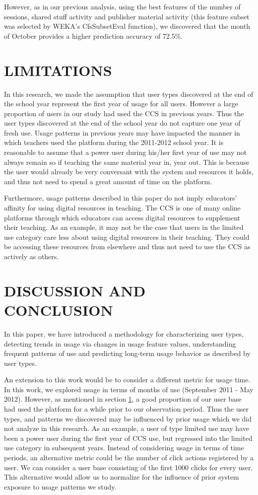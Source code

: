 \documentclass{acm_proc_article-sp}
\begin{document}
However, as in our previous analysis, using the best features of the number of sessions, shared stuff activity and publisher material activity (this feature subset was selected by WEKA's CfsSubsetEval function), we discovered that the month of October provides a higher prediction accuracy of 72.5\%.

\section{LIMITATIONS}\label{limitations}
In this research, we made the assumption that user types discovered at the end of the school year represent the first year of usage for all users. However a large proportion of users in our study had used the CCS in previous years. Thus the user types discovered at the end of the school year do not capture one year of fresh use. Usage patterns in previous years may have impacted the manner in which teachers used the platform during the 2011-2012 school year. It is reasonable to assume that a power user during his/her first year of use may not always remain so if teaching the same material year in, year out. This is because the user would already be very conversant with the system and resources it holds, and thus not need to spend a great amount of time on the platform.

Furthermore, usage patterns described in this paper do not imply educators' affinity for using digital resources in teaching. The CCS is one of many online platforms through which educators can access digital resources to supplement their teaching. As an example, it may not be the case that users in the limited use category care less about using digital resources in their teaching. They could be accessing these resources from elsewhere and thus not need to use the CCS as actively as others.

\section{DISCUSSION AND CONCLUSION}
In this paper, we have introduced a methodology for characterizing user types, detecting trends in usage via changes in usage feature values, understanding frequent patterns of use and predicting long-term usage behavior as described by user types.

An extension to this work would be to consider a different metric for usage time. In this work, we explored usage in terms of months of use (September 2011 - May 2012). However, as mentioned in section \ref{limitations}, a good proportion of our user base had used the platform for a while prior to our observation period. Thus the user types, and patterns we discovered may be influenced by prior usage which we did not analyze in this research. As an example, a user of type limited use may have been a power user during the first year of CCS use, but regressed into the limited use category in subsequent years. Instead of considering usage in terms of time periods, an alternative metric could be the number of click actions registered by a user. We can consider a user base consisting of the first 1000 clicks for every user. This alternative would allow us to normalize for the influence of prior system exposure to usage patterns we study. 
\end{document}
